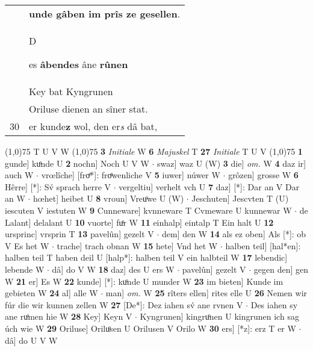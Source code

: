 \documentclass[8pt,a4paper,notitlepage]{article}
\begin{document}
\begin{table}[ht]
\begin{minipage}[t]{0.5\linewidth}
\begin{tabular}{rl}
 & \textbf{unde gâben im prîs ze gesellen}.\\ 
 & \begin{large}D\end{large}es \textbf{âbendes} âne \textbf{rûnen}\\ 
 & Key bat Kyngrunen\\ 
 & Oriluse dienen an sîner stat.\\ 
30 & er kunde\textbf{z} wol, den er\textit{s} dâ bat,\\ 
\end{tabular}
\scriptsize
\line(1,0){75} \newline
T U V W \newline
\line(1,0){75} \newline
\textbf{3} \textit{Initiale} W  \textbf{6} \textit{Majuskel} T  \textbf{27} \textit{Initiale} T U V  \newline
\line(1,0){75} \newline
\textbf{1} gunde] kuͦnde U \textbf{2} nochn] Noch U V W  $\cdot$ swaz] waz U (W) \textbf{3} die] \textit{om.} W \textbf{4} daz ir] auch W  $\cdot$ vrœlîche] [froͤ*]: froͤwenliche V \textbf{5} iuwer] núwer W  $\cdot$ grôzen] grosse W \textbf{6} Hêrre] [*]: Sv́ sprach herre V  $\cdot$ vergeltiu] verhelt vch U \textbf{7} daz] [*]: Dar an V Dar an W  $\cdot$ hœhet] heibet U \textbf{8} vroun] Vreuͦwe U (W)  $\cdot$ Jeschuten] Jescvten T (U) iescuten V iestuten W \textbf{9} Cunneware] kvnneware T Cvmeware U kunnewar W  $\cdot$ de Lalant] delalant U \textbf{10} vuorte] fuͦr W \textbf{11} einhalp] eintalp T Ein halt U \textbf{12} ursprinc] vrsprin T \textbf{13} pavelûn] gezelt V  $\cdot$ dem] den W \textbf{14} als ez oben] Als [*]: ob V Es het W  $\cdot$ trache] trach obnan W \textbf{15} hete] Vnd het W  $\cdot$ halben teil] [hal*en]: halben teil T haben deil U [halp*]: halben teil V ein halbteil W \textbf{17} lebendic] lebende W  $\cdot$ dâ] do V W \textbf{18} daz] des U ers W  $\cdot$ pavelûn] gezelt V  $\cdot$ gegen den] gen W \textbf{21} er] Es W \textbf{22} kunde] [*]: kuͦnde U munder W \textbf{23} im bieten] Kunde im gebieten W \textbf{24} al] alle W  $\cdot$ man] \textit{om.} W \textbf{25} rîters ellen] rites elle U \textbf{26} Nemen wir fúr die wir kunnen zellen W \textbf{27} [De*]: Dez iahen sv́ ane rvnen V  $\cdot$ Des iahen sy ane ruͦmen hie W \textbf{28} Key] Keyn V  $\cdot$ Kyngrunen] kingruͦnen U kingrunen ich sag úch wie W \textbf{29} Oriluse] Oriluͦsen U Orilusen V Orilo W \textbf{30} ers] [*z]: erz T er W  $\cdot$ dâ] do U V W \newline
\end{minipage}
\end{table}
\end{document}
